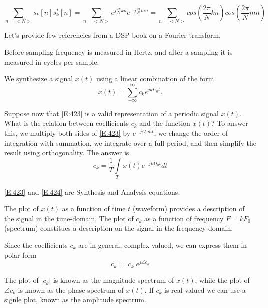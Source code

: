 \documentclass[oneside, final, 14pt]{extarticle}
\begin{document}
\[
  \sum_{n=<N>} s_k[n] s_k^*[n] =
  \sum_{n=<N>} e^{j \frac{2\pi}{N} kn}
		e^{-j \frac{2\pi}{N} mn} =
  \sum_{n=<N>} cos \left(\frac{2\pi}{N} kn\right)
		cos \left(\frac{2\pi}{N} mn\right)
\]

Let's provide few referencies from a DSP book on a Fourier transform.

Before sampling frequency is measured in Hertz, and after a sampling
it is measured in cycles per sample.

We synthesize a signal $x(t)$ using a linear combination of the form
\begin{equation} \label{E:423}
  x(t) = \sum_{-\infty}^{\infty} c_k e^{jk\Omega_0t}.
\end{equation}

Suppose now that \eqref{E:423} is a valid representation of a periodic
signal $x(t)$. What is the relation between coefficients $c_k$ and
the function $x(t)$? To answer this, we multiply both sides
of \eqref{E:423} by $e^{-j\Omega_0 m t}$, we change the order of
integration with summation, we integrate over a full period, and then
simplify the result using orthogonality. The answer is
\begin{equation} \label{E:424}
  c_k = \frac{1}{T} \underset{T_0}\int x(t) e^{-jk\Omega_0t} dt
\end{equation}

\eqref{E:423} and \eqref{E:424} are Synthesis and Analysis equations.

The plot of $x(t)$ as a function of time $t$ (waveform) provides
a description of the signal in the time-domain.
The plot of $c_k$ as a function of frequency $F = k F_0$ (spectrum)
constitues a description on the signal in the frequency-domain.

Since the coefficients $c_k$ are in general, complex-valued, we
can express them in polar form
\[
  c_k = |c_k| e^{j\angle c_k}
\]

The plot of $|c_k|$ is known as the magnitude spectrum
of $x(t)$, while the plot of $\angle c_k$ is known as the phase spectrum
of $x(t)$. If $c_k$ is real-valued we can use a signle plot, known
as the amplitude spectrum.
\end{document}
